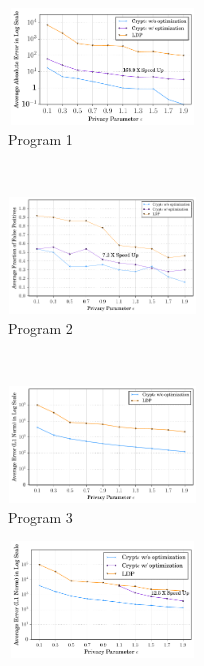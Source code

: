 \begin{figure}
    \centering
    \begin{subfigure}[b]{0.2\textwidth}
        \includegraphics[width=5cm,height=3.1cm]{t1.pdf}
        \caption{ Program 1}
        \label{fig:gull}
    \end{subfigure}\quad \qquad\quad 
    ~ %
    \begin{subfigure}[b]{0.3\textwidth}
       \qquad \includegraphics[width=5cm,height=3.1cm]{t22.pdf}
        \caption{ Program 2}
        \label{fig:tiger}
    \end{subfigure}
    ~ %
    \begin{subfigure}[b]{0.3\textwidth}
    \qquad    \includegraphics[width=5cm,height=3.1cm]{t3.pdf}
        \caption{Program 3}
        \label{fig:mouse}\end{subfigure}
          \begin{subfigure}[b]{0.3\textwidth}
    \qquad    \includegraphics[width=5cm,height=3.1cm]{t4.pdf}

\end{subfigure}
\end{figure}
